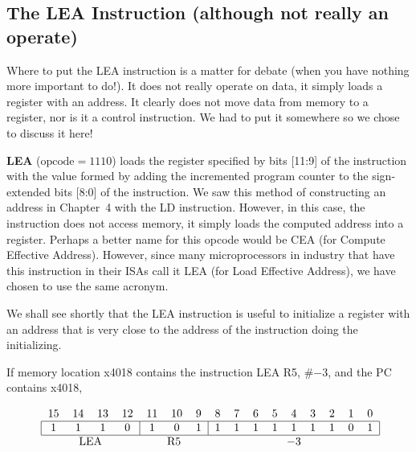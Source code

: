 \documentclass{patt}
\begin{document}
\endgroup

\vspace{-24pt}

\subsection{The LEA Instruction (although not really an operate)}

Where to put the LEA instruction is a matter for
debate (when you have nothing more important to do!).  It does not really
operate on data, it simply loads a register with an address.  It clearly
does not move data from memory to a register, nor is it a control instruction.
We had to put it somewhere so we chose to discuss it here!

{\bf LEA} ($\text{opcode}=1110$) loads the register specified by 
bits [11:9] of the instruction with
the value formed by adding the incremented program counter to the
sign-extended bits [8:0] of the instruction.  We saw this method of
constructing an address in Chapter~4 with the LD instruction.  However, in
this case, the instruction does not access memory, it simply loads the
computed address into a register.  Perhaps a better name for this opcode would
be CEA (for Compute Effective Address).  However, since many microprocessors
in industry that have this instruction in their ISAs call it LEA (for Load 
Effective Address), we have chosen to use the same acronym.

We shall see shortly that the LEA instruction is useful 
to initialize a register with an address that is very close to
the address of the instruction doing the initializing.

If memory location x4018 contains the instruction LEA R5, \#$-$3, and 
the PC contains x4018,

\begin{equation*}
\mbox{\renewcommand{\tabcolsep}{6pt}
\begin{tabular}{cccccccccccccccc}
15 & 14 & 13 & 12 & 11 & 10 & 9 & 8 & 7 & 6 & 5 & 4 & 3 & 2 & 1 & 0\\
\hline
\multicolumn{1}{|c}{1}&\multicolumn{1}{c}{1}&
\multicolumn{1}{c}{1}&\multicolumn{1}{c}{0}&
\multicolumn{1}{|c}{1}&\multicolumn{1}{c}{0}&
\multicolumn{1}{c}{1}&\multicolumn{1}{|c}{1}&
\multicolumn{1}{c}{1}&\multicolumn{1}{c}{1}&
\multicolumn{1}{c}{1}&\multicolumn{1}{c}{1}&
\multicolumn{1}{c}{1}&\multicolumn{1}{c}{1}&
\multicolumn{1}{c}{0}&\multicolumn{1}{c|}{1}\\
\hline
\multicolumn{4}{c}{LEA} &\multicolumn{3}{c}{R5} &
\multicolumn{9}{c}{$-3$}\\
\end{tabular}}
\end{equation*}
\end{document}
